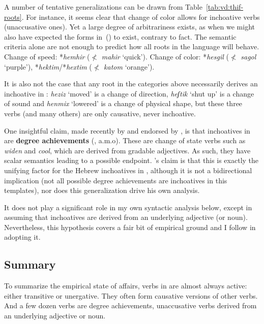 

A number of tentative generalizations can be drawn from Table~\ref{tab:vd:thif-roots}. For instance, it seems clear that change of color allows for inchoative verbs (unaccusative ones). Yet a large degree of arbitrariness exists, as when we might also have expected the forms in~(\nextx) to exist, contrary to fact. The semantic criteria alone are not enough to predict how all roots in the language will behave.
\pex
	\a Change of speed:
		*\emph{hemhir} ($\nless$ \emph{mahir} `quick').
	\a Change of color:
		*\emph{hesgil} ($\nless$ \emph{sagol} `purple'), *\emph{hektim}/*\emph{hextim} ($\nless$ \emph{katom} `orange').
\xe

It is also not the case that any root in the categories above necessarily derives an inchoative in {\thif}: \emph{heziz} `moved' is a change of direction, \emph{heʃtik} `shut up' is a change of sound and \emph{henmix} `lowered' is a change of physical shape, but these three verbs (and many others) are only causative, never inchoative.

One insightful claim, made recently by \cite{lev16} and endorsed by \cite{kastner19tlr}, is that inchoatives in {\thif} are \textbf{degree achievements} (\citealt{dowty91,hayetal99,rotsteinwinter04,kennedylevin08,bobaljik12,mcnally17}, a.m.o). These are change of state verbs such as \emph{widen} and \emph{cool}, which are derived from gradable adjectives. As such, they have scalar semantics leading to a possible endpoint. \citeauthor{lev16}'s claim is that this is exactly the unifying factor for the Hebrew inchoatives in {\thif}, although it is not a bidirectional implication (not all possible degree achievements are inchoatives in this templates), nor does this generalization drive his own analysis.

It does not play a significant role in my own syntactic analysis below, except in assuming that inchoatives are derived from an underlying adjective (or noun). Nevertheless, this hypothesis covers a fair bit of empirical ground and I follow \cite{lev16} in adopting it. 

	\subsection{Summary}
To summarize the empirical state of affairs, verbs in {\thif} are almost always active: either transitive or unergative. They often form causative versions of other verbs. And a few dozen verbs are degree achievements, unaccusative verbs derived from an underlying adjective or noun.

